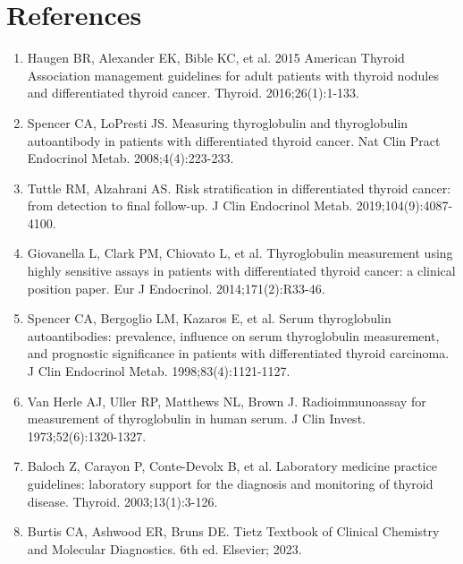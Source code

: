 \section*{References}
\begin{enumerate}
  \item Haugen BR, Alexander EK, Bible KC, et al. 2015 American Thyroid Association management guidelines for adult patients with thyroid nodules and differentiated thyroid cancer. Thyroid. 2016;26(1):1-133.
  \item Spencer CA, LoPresti JS. Measuring thyroglobulin and thyroglobulin autoantibody in patients with differentiated thyroid cancer. Nat Clin Pract Endocrinol Metab. 2008;4(4):223-233.
  \item Tuttle RM, Alzahrani AS. Risk stratification in differentiated thyroid cancer: from detection to final follow-up. J Clin Endocrinol Metab. 2019;104(9):4087-4100.
  \item Giovanella L, Clark PM, Chiovato L, et al. Thyroglobulin measurement using highly sensitive assays in patients with differentiated thyroid cancer: a clinical position paper. Eur J Endocrinol. 2014;171(2):R33-46.
  \item Spencer CA, Bergoglio LM, Kazaros E, et al. Serum thyroglobulin autoantibodies: prevalence, influence on serum thyroglobulin measurement, and prognostic significance in patients with differentiated thyroid carcinoma. J Clin Endocrinol Metab. 1998;83(4):1121-1127.
  \item Van Herle AJ, Uller RP, Matthews NL, Brown J. Radioimmunoassay for measurement of thyroglobulin in human serum. J Clin Invest. 1973;52(6):1320-1327.
  \item Baloch Z, Carayon P, Conte-Devolx B, et al. Laboratory medicine practice guidelines: laboratory support for the diagnosis and monitoring of thyroid disease. Thyroid. 2003;13(1):3-126.
  \item Burtis CA, Ashwood ER, Bruns DE. Tietz Textbook of Clinical Chemistry and Molecular Diagnostics. 6th ed. Elsevier; 2023.
\end{enumerate}

\clearpage
